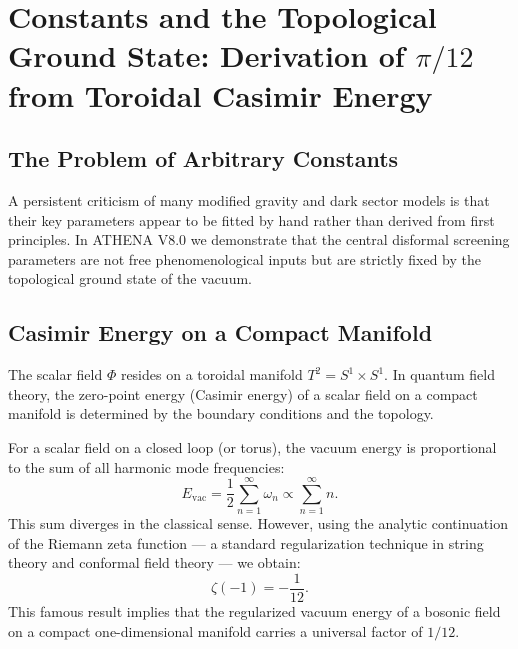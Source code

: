 \documentclass[11pt,a4paper]{article}
\begin{document}
\section{Constants and the Topological Ground State: Derivation of \(\pi/12\) from Toroidal Casimir Energy}

\subsection{The Problem of Arbitrary Constants}
A persistent criticism of many modified gravity and dark sector models is that their key parameters appear to be fitted by hand rather than derived from first principles. In ATHENA V8.0 we demonstrate that the central disformal screening parameters are not free phenomenological inputs but are strictly fixed by the topological ground state of the vacuum.

\subsection{Casimir Energy on a Compact Manifold}
The scalar field \(\Phi\) resides on a toroidal manifold \(T^{2} = S^{1}\times S^{1}\). In quantum field theory, the zero-point energy (Casimir energy) of a scalar field on a compact manifold is determined by the boundary conditions and the topology.

For a scalar field on a closed loop (or torus), the vacuum energy is proportional to the sum of all harmonic mode frequencies:
\begin{equation}
E_{\mathrm{vac}} = \frac{1}{2}\sum_{n = 1}^{\infty}\omega_{n}\propto \sum_{n = 1}^{\infty}n. \tag{12}
\end{equation}
This sum diverges in the classical sense. However, using the analytic continuation of the Riemann zeta function — a standard regularization technique in string theory and conformal field theory — we obtain:
\begin{equation}
\zeta (-1) = -\frac{1}{12}. \tag{13}
\end{equation}
This famous result implies that the regularized vacuum energy of a bosonic field on a compact one-dimensional manifold carries a universal factor of \(1/12\).
\end{document}
